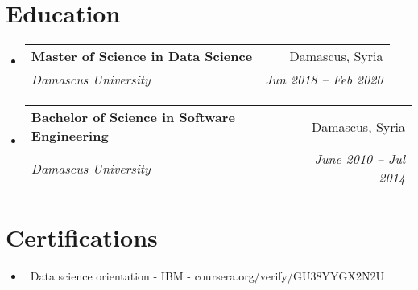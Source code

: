 \documentclass[letterpaper,10pt]{article}
\makeatletter
\newcommand{\resumeItem}[1]{\item\small{#1}}
\newcommand{\resumeSubheading}[4]{
\vspace{-1pt}\item
  \begin{tabular*}{0.97\textwidth}[t]{l@{\extracolsep{\fill}}r}
    \textbf{#1} & #2 \\
    \textit{#3} & \textit{#4} \\
  \end{tabular*}\vspace{-7pt}
}
\newcommand{\resumeSubHeadingList}{\begin{itemize}[leftmargin=0.15in, label={}]}
\newcommand{\resumeSubHeadingListEnd}{\end{itemize}}
\makeatother
\begin{document}
\section{Education}
\resumeSubHeadingList
  \resumeSubheading
      {Master of Science in Data Science}{Damascus, Syria}
      {Damascus University}{Jun 2018 -- Feb 2020}
  \resumeSubheading
      {Bachelor of Science in Software Engineering}{Damascus, Syria}
      {Damascus University}{June 2010 -- Jul 2014}
\resumeSubHeadingListEnd

\section{Certifications}
\resumeSubHeadingList
  \resumeItem{\textbullet\ Data science orientation - IBM - coursera.org/verify/GU38YYGX2N2U}
\resumeSubHeadingListEnd
\end{document}
